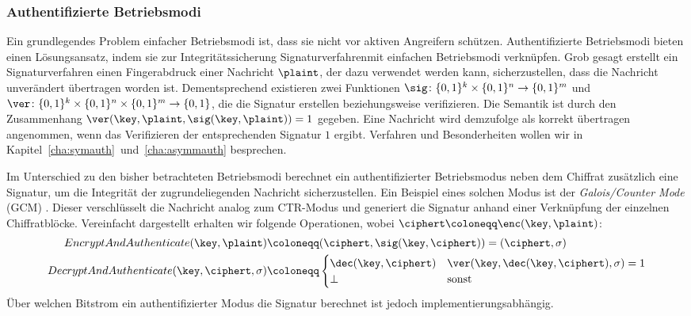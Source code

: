 \subsubsection{Authentifizierte Betriebsmodi}\label{sssec:gcm} 
Ein grundlegendes Problem einfacher Betriebsmodi ist, dass sie nicht vor
aktiven Angreifern schützen. Authentifizierte
Betriebsmodi bieten
einen Lösungsansatz, indem sie zur Integritätssicherung
Signaturverfahren\indexSig mit einfachen Betriebsmodi verknüpfen. 
 Grob gesagt erstellt ein Signaturverfahren einen Fingerabdruck einer
Nachricht $\plaint$, der dazu verwendet werden kann, sicherzustellen,
dass die Nachricht unverändert übertragen worden ist. Dementsprechend
existieren zwei Funktionen $\sig \colon \{0,1\}^k \times \{0,1\}^n
\rightarrow \{0,1\}^m$ und $\ver \colon \{0,1\}^k \times \{0,1\}^n
\times \{0,1\}^m \rightarrow \{0,1\}$, die die Signatur erstellen
beziehungsweise verifizieren. Die Semantik ist durch den Zusammenhang
$\ver(\key,\plaint,\sig(\key, \plaint)) = 1$ gegeben. Eine Nachricht
wird demzufolge als korrekt übertragen angenommen, wenn das Verifizieren
der entsprechenden Signatur $1$ ergibt.
Verfahren und Besonderheiten wollen wir in
Kapitel~\ref{cha:symauth}~und~\ref{cha:asymmauth} besprechen. 

Im Unterschied zu den bisher betrachteten Betriebsmodi berechnet ein
authentifizierter Betriebsmodus neben dem Chiffrat zusätzlich eine
Signatur, um die Integrität der zugrundeliegenden Nachricht
sicherzustellen. Ein Beispiel eines solchen Modus ist der
\emph{Galois/Counter Mode} (GCM) \cite{NIST_GCM05}. Dieser verschlüsselt
die Nachricht analog zum CTR-Modus und generiert die Signatur anhand
einer Verknüpfung der einzelnen Chiffratblöcke. Vereinfacht dargestellt
erhalten wir folgende Operationen, wobei $\ciphert \coloneqq \enc(\key,
\plaint)$:
\begin{align*}
  EncryptAndAuthenticate(\key, \plaint) &\coloneqq (\ciphert, \sig(\key, \ciphert)) = (\ciphert, \sigma)\\
  DecryptAndAuthenticate(\key, \ciphert, \sigma) &\coloneqq \begin{cases}
    \dec(\key, \ciphert) & \ver(\key, \dec(\key, \ciphert), \sigma) = 1 \\
    \bot & \textnormal{sonst}
  \end{cases}
\end{align*}
Über welchen Bitstrom ein authentifizierter Modus die Signatur berechnet
ist jedoch implementierungsabhängig. 

